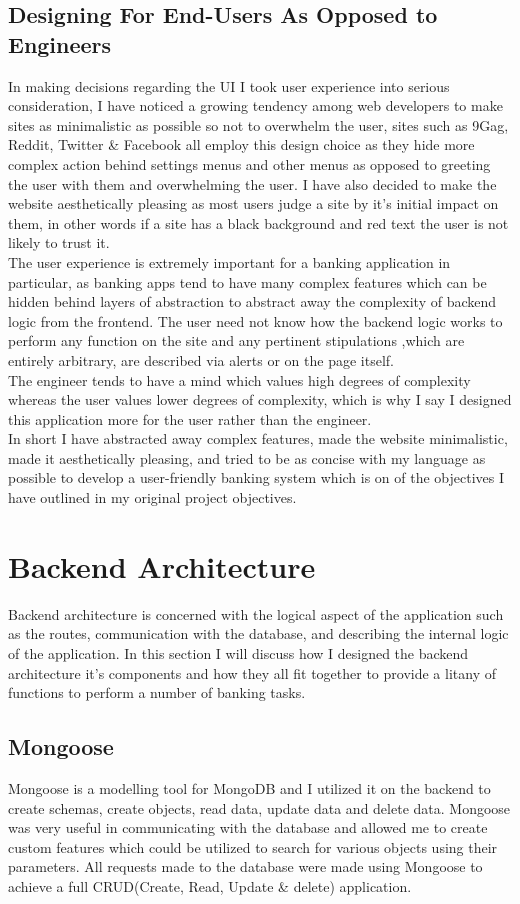 \subsection{Designing For End-Users As Opposed to Engineers}
In making decisions regarding the UI I took user experience into serious consideration,
I have noticed a growing tendency among web developers to make sites as minimalistic as
possible so not to overwhelm the user, sites such as 9Gag, Reddit, Twitter \& Facebook
all employ this design choice as they hide more complex action behind settings menus
and other menus as opposed to greeting the user with them and overwhelming the user.  I have also decided to
make the website aesthetically pleasing as most users judge a site by it's initial
impact on them, in other words if a site has a black background and red text the user
is not likely to trust it.
\\
The user experience is extremely important for a banking application in particular,
as banking apps tend to have many complex features which can be hidden behind layers
of abstraction to abstract away the complexity of backend logic from the frontend.
The user need not know how the backend logic works to perform any function on the
site and any pertinent stipulations ,which are entirely arbitrary, are described via
alerts or on the page itself.
\\
The engineer tends to have a mind which values high degrees of complexity whereas
the user values lower degrees of complexity, which is why I say I designed this
application more for the user rather than the engineer.
\\
In short I have abstracted away complex features, made the website minimalistic,
made it aesthetically pleasing, and tried to be as concise with my language as
possible to develop a user-friendly banking system which is on of the objectives
I have outlined in my original project objectives.
\section{Backend Architecture}
Backend architecture is concerned with the logical aspect of the application such as the routes, communication with the database, and describing the internal logic of the application.  In this section I will discuss how I designed the backend architecture it's components and how they all fit together to provide a litany of functions to perform a number of banking tasks.
\subsection{Mongoose}
Mongoose is a modelling tool for MongoDB and I utilized it on the backend to create schemas, create objects, read data, update data and delete data. Mongoose was very useful in communicating with the database and allowed me to create custom features which could be utilized to search for various objects using their parameters.  All requests made to the database were made using Mongoose to achieve a full CRUD(Create, Read, Update \& delete) application.
